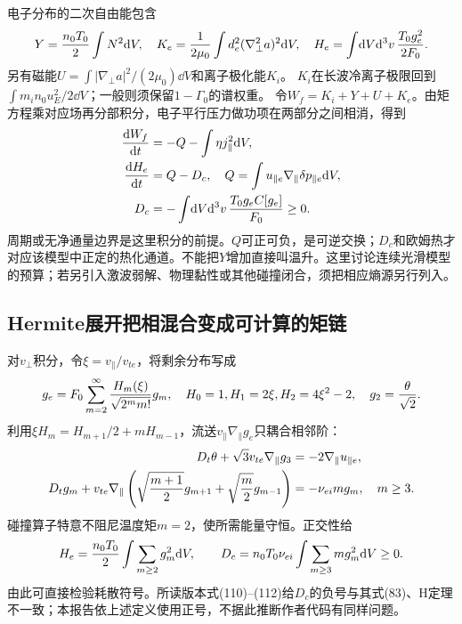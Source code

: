 电子分布的二次自由能包含
\begin{equation}
 Y={n_0T_0\over2}\int N^2\mathrm d V,\quad
 K_e={1\over2\mu_0}\int d_e^2(\nabla_\perp^2a)^2\mathrm d V,\quad
 H_e=\int\!\mathrm d V\mathrm d^3v\,{T_0g_e^2\over2F_0}.
\end{equation}
另有磁能$U=\int|\nabla_\perp a|^2/(2\mu_0)\dd V$和离子极化能$K_i$。
$K_i$在长波冷离子极限回到$\int m_in_0u_E^2/2\dd V$；一般则须保留$1-\Gamma_0$的谱权重。
令$W_f=K_i+Y+U+K_e$。由矩方程乘对应场再分部积分，电子平行压力做功项在两部分之间相消，得到
\begin{align}
 {\mathrm dW_f\over\mathrm dt}&=-Q-\int\eta j_\parallel^2\mathrm d V,\\
 {\mathrm d H_e\over\mathrm d t}&=Q-D_c,\quad
 Q=\int u_{\parallel e}\nabla_\parallel\delta p_{\parallel e}\mathrm d V,\\
 D_c&=-\int\!\mathrm d V\mathrm d^3v\,{T_0g_eC[g_e]\over F_0}\ge0.
 \label{eq:selected-heating}
\end{align}
周期或无净通量边界是这里积分的前提。$Q$可正可负，是可逆交换；$D_c$和欧姆热才对应该模型中正定的热化通道。不能把$Y$增加直接叫温升。这里讨论连续光滑模型的预算；若另引入激波弱解、物理黏性或其他碰撞闭合，须把相应熵源另行列入。

\subsection{Hermite展开把相混合变成可计算的矩链}
对$v_\perp$积分，令$\xi=v_\parallel/v_{te}$，将剩余分布写成
\begin{equation}
 g_e=F_0\sum_{m=2}^{\infty}{H_m(\xi)\over\sqrt{2^m m!}}g_m,
 \quad H_0=1, H_1=2\xi, H_2=4\xi^2-2,\quad g_2={\theta\over\sqrt2}.
\end{equation}
利用$\xi H_m=H_{m+1}/2+mH_{m-1}$，流送$v_\parallel\nabla_\parallel g_e$只耦合相邻阶：
\begin{align}
 D_t\theta+\sqrt3v_{te}\nabla_\parallel g_3&=-2\nabla_\parallel u_{\parallel e},\\
 D_tg_m+v_{te}\nabla_\parallel\left(\sqrt{{m+1\over2}}g_{m+1}
 +\sqrt{{m\over2}}g_{m-1}\right)&=-\nu_{ei}m g_m,\quad m\ge3.
\end{align}
碰撞算子特意不阻尼温度矩$m=2$，使所需能量守恒。正交性给
\begin{equation}
 H_e={n_0T_0\over2}\int\sum_{m\ge2}g_m^2\mathrm d V,\qquad
 D_c=n_0T_0\nu_{ei}\int\sum_{m\ge3}m g_m^2\mathrm d V\ge0.
\end{equation}
由此可直接检验耗散符号。所读版本式(110)--(112)给$D_c$的负号与其式(83)、H定理不一致；本报告依上述定义使用正号，不据此推断作者代码有同样问题。

